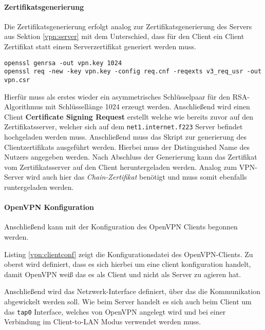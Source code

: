 \paragraph{Zertifikatsgenerierung}

Die Zertifikatsgenerierung erfolgt analog zur Zertifikatsgenerierung des Servers aus Sektion \ref{vpn:server} mit dem Unterschied, dass für den Client ein Client Zertifikat statt einem Serverzertifikat generiert werden muss.


\begin{lstlisting}
openssl genrsa -out vpn.key 1024
openssl req -new -key vpn.key -config req.cnf -reqexts v3_req_usr -out vpn.csr
\end{lstlisting}

Hierfür muss als erstes wieder ein asymmetrisches Schlüsselpaar für den RSA-Algorithmus mit Schlüssellänge 1024 erzeugt werden. Anschließend wird einen Client \textbf{Certificate Signing Request} erstellt welche wie bereits zuvor auf den Zertifikatsserver, welcher sich auf dem \texttt{net1.internet.f223} Server befindet hochgeladen werden muss. Anschließend muss das Skript zur generierung des Clientzertifikats ausgeführt werden. Hierbei muss der Distinguished Name des Nutzers angegeben werden.
Nach Abschluss der Generierung kann das Zertifikat vom Zertifikatsserver auf den Client heruntergeladen werden. Analog zum VPN-Server wird auch hier das \emph{Chain-Zertifikat} benötigt und muss somit ebenfalls runtergeladen werden.

\paragraph{OpenVPN Konfiguration}

Anschließend kann mit der Konfiguration des OpenVPN Clients begonnen werden.



Listing \ref{vpn:clientconf} zeigt die Konfigurationsdatei des OpenVPN-Clients. Zu oberst wird definiert, dass es sich hierbei um eine client konfiguration handelt, damit OpenVPN weiß das es als Client und nicht als Server zu agieren hat.

Anschließend wird das Netzwerk-Interface definiert, über das die Kommunikation abgewickelt werden soll. Wie beim Server handelt es sich auch beim Client um das \texttt{tap0} Interface, welches von OpenVPN angelegt wird und bei einer Verbindung im Client-to-LAN Modus verwendet werden muss.

